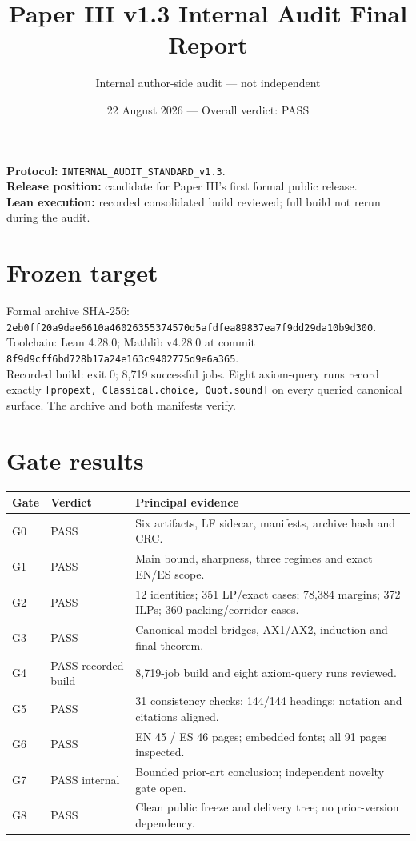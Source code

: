 \documentclass[11pt]{article}
\title{Paper III v1.3 Internal Audit Final Report}
\author{Internal author-side audit --- not independent}
\date{22 August 2026 --- Overall verdict: PASS}
\begin{document}
\maketitle
\textbf{Protocol:} \texttt{INTERNAL\_AUDIT\_STANDARD\_v1.3}.\\
\textbf{Release position:} candidate for Paper III's first formal public release.\\
\textbf{Lean execution:} recorded consolidated build reviewed; full build not rerun during the audit.

\section{Frozen target}
Formal archive SHA-256:\\
{\small\nolinkurl{2eb0ff20a9dae6610a46026355374570d5afdfea89837ea7f9dd29da10b9d300}}.\\
Toolchain: Lean 4.28.0; Mathlib v4.28.0 at commit
\nolinkurl{8f9d9cff6bd728b17a24e163c9402775d9e6a365}.\\
Recorded build: exit 0; 8,719 successful jobs. Eight axiom-query runs record
exactly \texttt{[propext, Classical.choice, Quot.sound]} on every queried
canonical surface. The archive and both manifests verify.

\section{Gate results}
\begin{longtable}{p{.17\linewidth}p{.20\linewidth}p{.53\linewidth}}
\toprule Gate & Verdict & Principal evidence \\ \midrule
G0 & PASS & Six artifacts, LF sidecar, manifests, archive hash and CRC. \\
G1 & PASS & Main bound, sharpness, three regimes and exact EN/ES scope. \\
G2 & PASS & 12 identities; 351 LP/exact cases; 78,384 margins; 372 ILPs; 360 packing/corridor cases. \\
G3 & PASS & Canonical model bridges, AX1/AX2, induction and final theorem. \\
G4 & PASS recorded build & 8,719-job build and eight axiom-query runs reviewed. \\
G5 & PASS & 31 consistency checks; 144/144 headings; notation and citations aligned. \\
G6 & PASS & EN 45 / ES 46 pages; embedded fonts; all 91 pages inspected. \\
G7 & PASS internal & Bounded prior-art conclusion; independent novelty gate open. \\
G8 & PASS & Clean public freeze and delivery tree; no prior-version dependency. \\
\bottomrule
\end{longtable}
\end{document}
